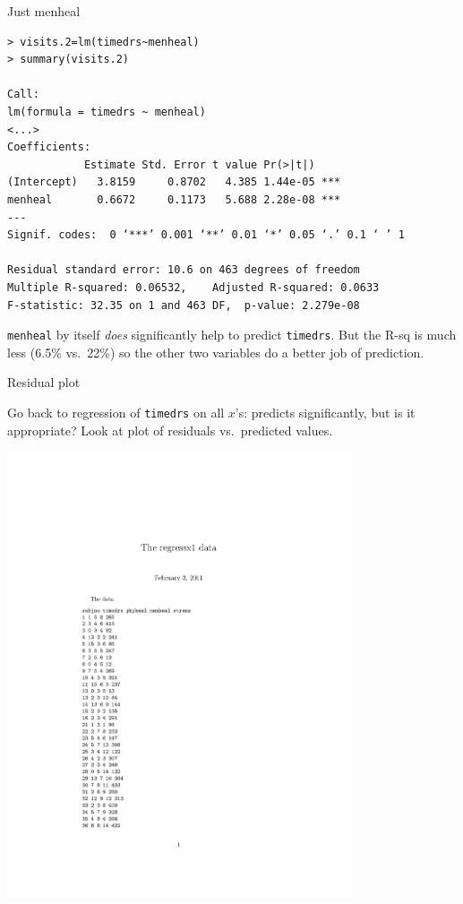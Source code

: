 \documentclass{beamer}
\begin{document}
\begin{frame}[fragile]{Just menheal}

{\scriptsize
\begin{verbatim}
> visits.2=lm(timedrs~menheal)
> summary(visits.2)

Call:
lm(formula = timedrs ~ menheal)
<...>
Coefficients:
            Estimate Std. Error t value Pr(>|t|)    
(Intercept)   3.8159     0.8702   4.385 1.44e-05 ***
menheal       0.6672     0.1173   5.688 2.28e-08 ***
---
Signif. codes:  0 ‘***’ 0.001 ‘**’ 0.01 ‘*’ 0.05 ‘.’ 0.1 ‘ ’ 1 

Residual standard error: 10.6 on 463 degrees of freedom
Multiple R-squared: 0.06532,	Adjusted R-squared: 0.0633 
F-statistic: 32.35 on 1 and 463 DF,  p-value: 2.279e-08 

\end{verbatim}
}

\verb-menheal- by itself {\em does} significantly help to predict \verb-timedrs-. But the R-sq is much less (6.5\% vs.\ 22\%) so the other two variables do a better job of prediction. 


\end{frame}

\begin{frame}[fragile]{Residual plot}


Go back to regression of \verb-timedrs- on all $x$'s: predicts significantly, but is it appropriate? Look at plot of residuals vs.\ predicted values.


\includegraphics[width=4in]{regressx1}

\end{frame}
\end{document}
